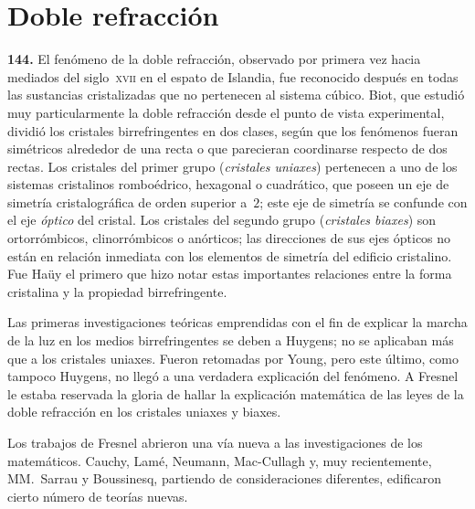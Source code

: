 \chapter{Doble refracción}
\label{cap:doble-refraccion}

\noindent\textbf{144.} El fenómeno de la doble refracción, observado por
primera vez hacia mediados del siglo~\textsc{xvii} en el espato de
Islandia, fue reconocido después en todas las sustancias cristalizadas que
no pertenecen al sistema cúbico. Biot, que estudió muy particularmente la
doble refracción desde el punto de vista experimental, dividió los
cristales birrefringentes en dos clases, según que los fenómenos fueran
simétricos alrededor de una recta o que parecieran coordinarse respecto de
dos rectas. Los cristales del primer grupo (\emph{cristales uniaxes})
pertenecen a uno de los sistemas cristalinos romboédrico, hexagonal o
cuadrático, que poseen un eje de simetría cristalográfica de orden
superior a~$2$; este eje de simetría se confunde con el eje \emph{óptico}
del cristal. Los cristales del segundo grupo (\emph{cristales biaxes}) son
ortorrómbicos, clinorrómbicos o anórticos; las direcciones de sus ejes
ópticos no están en relación inmediata con los elementos de simetría del
edificio cristalino. Fue Haüy el primero que hizo notar estas importantes
relaciones entre la forma cristalina y la propiedad birrefringente.

Las primeras investigaciones teóricas emprendidas con el fin de
explicar la marcha de la luz en los medios birrefringentes se deben a
Huygens; no se aplicaban más que a los cristales uniaxes. Fueron retomadas
por Young, pero este último, como tampoco Huygens, no llegó a una
verdadera explicación del fenómeno. A Fresnel le estaba reservada la gloria de hallar
la explicación matemática de las leyes de la doble refracción en los
cristales uniaxes y biaxes.

Los trabajos de Fresnel abrieron una vía nueva a las investigaciones de los
matemáticos. Cauchy, Lamé, Neumann, Mac-Cullagh y, muy recientemente,
MM.~Sarrau y Boussinesq, partiendo de consideraciones diferentes,
edificaron cierto número de teorías nuevas.

